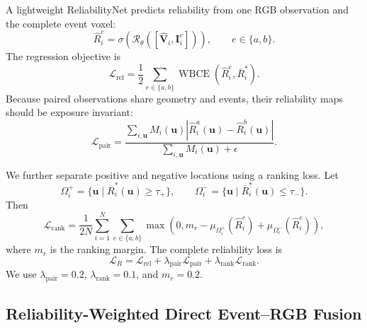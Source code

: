 A lightweight ReliabilityNet predicts reliability from one RGB observation
and the complete event voxel:
\begin{equation}
    \widehat{R}_i^{e}=
    \sigma\!\left(
    \mathcal{R}_{\theta}
    ([\widehat{\bm{V}}_i,\bm{I}_i^{e}])
    \right),\qquad e\in\{a,b\}.
    \label{eq:reliability_prediction}
\end{equation}
The regression objective is
\begin{equation}
    \mathcal{L}_{\mathrm{rel}}=
    \frac{1}{2}\sum_{e\in\{a,b\}}
    \operatorname{WBCE}
    (\widehat{R}_i^{e},\overline{R}_i^{\ast}).
    \label{eq:reliability_bce}
\end{equation}
Because paired observations share geometry and events, their reliability maps
should be exposure invariant:
\begin{equation}
    \mathcal{L}_{\mathrm{pair}}=
    \frac{\sum_{i,\bm{u}}M_i(\bm{u})
    |\widehat{R}_i^{a}(\bm{u})-
     \widehat{R}_i^{b}(\bm{u})|}
    {\sum_{i,\bm{u}}M_i(\bm{u})+\epsilon}.
    \label{eq:reliability_pair}
\end{equation}

We further separate positive and negative locations using a ranking loss. Let
\begin{equation}
    \Omega_i^{+}=\{\bm{u}\mid
    \overline{R}_i^{\ast}(\bm{u})\geq\tau_{+}\},\qquad
    \Omega_i^{-}=\{\bm{u}\mid
    \overline{R}_i^{\ast}(\bm{u})\leq\tau_{-}\}.
\end{equation}
Then
\begin{equation}
    \mathcal{L}_{\mathrm{rank}}=
    \frac{1}{2N}\sum_{i=1}^{N}\sum_{e\in\{a,b\}}
    \max\!\left(
    0,m_r-\mu_{\Omega_i^{+}}(\widehat{R}_i^{e})
    +\mu_{\Omega_i^{-}}(\widehat{R}_i^{e})
    \right),
    \label{eq:reliability_rank}
\end{equation}
where $m_r$ is the ranking margin. The complete reliability loss is
\begin{equation}
    \boxed{
    \mathcal{L}_{R}=
    \mathcal{L}_{\mathrm{rel}}+
    \lambda_{\mathrm{pair}}\mathcal{L}_{\mathrm{pair}}+
    \lambda_{\mathrm{rank}}\mathcal{L}_{\mathrm{rank}}
    }.
    \label{eq:reliability_loss}
\end{equation}
We use $\lambda_{\mathrm{pair}}=0.2$,
$\lambda_{\mathrm{rank}}=0.1$, and $m_r=0.2$.

\subsection{Reliability-Weighted Direct Event--RGB Fusion}
\label{sec:event_refinement}

